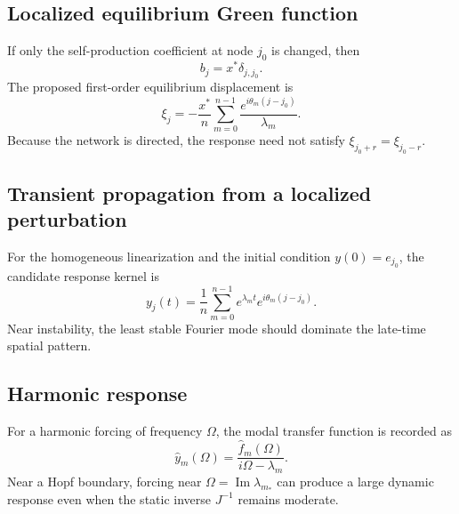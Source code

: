 \documentclass[11pt, reqno]{amsart}
\theoremstyle{definition}
\theoremstyle{remark}
\newcommand{\Imm}{\operatorname{Im}}
\begin{document}

\subsection{Localized equilibrium Green function}

If only the self-production coefficient at node $j_0$ is changed, then
\[
    b_j=x^*\delta_{j,j_0}.
\]
The proposed first-order equilibrium displacement is
\begin{equation}
\label{eq:green-function}
\boxed{
    \xi_j
    =
    -\frac{x^*}{n}
    \sum_{m=0}^{n-1}
    \frac{e^{i\theta_m(j-j_0)}}{\lambda_m}.
}
\end{equation}
Because the network is directed, the response need not satisfy
$\xi_{j_0+r}=\xi_{j_0-r}$.


\subsection{Transient propagation from a localized perturbation}

For the homogeneous linearization and the initial condition
$y(0)=e_{j_0}$, the candidate response kernel is
\begin{equation}
\label{eq:transient-kernel}
\boxed{
    y_j(t)
    =
    \frac1n
    \sum_{m=0}^{n-1}
    e^{\lambda_m t}
    e^{i\theta_m(j-j_0)}.
}
\end{equation}
Near instability, the least stable Fourier mode should dominate the late-time
spatial pattern.


\subsection{Harmonic response}

For a harmonic forcing of frequency $\Omega$, the modal transfer function is
recorded as
\begin{equation}
\label{eq:harmonic-response}
    \widehat y_m(\Omega)
    =
    \frac{\widehat f_m(\Omega)}{i\Omega-\lambda_m}.
\end{equation}
Near a Hopf boundary, forcing near
$\Omega=\Imm\lambda_{m_*}$ can produce a large dynamic response even when the
static inverse $J^{-1}$ remains moderate.
\end{document}
